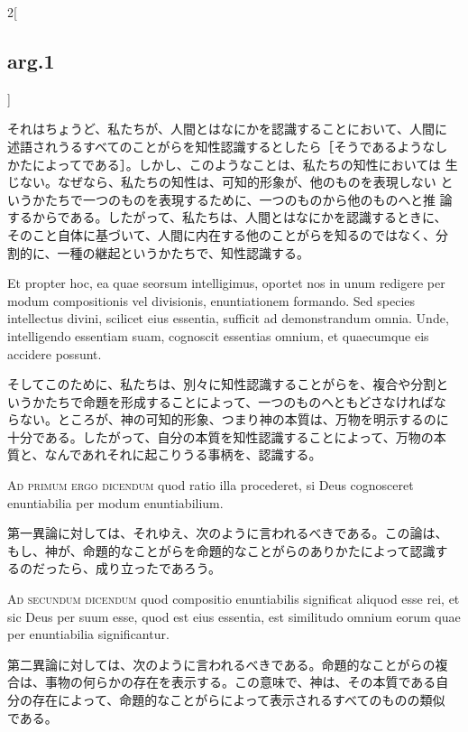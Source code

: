 \documentclass[paper=a4paper,fontsize=10pt,jafontsize=9pt,titlepage]{jlreq}
\begin{document}
\begin{paracol}{2}[\subsection{arg.1}]
\switchcolumn

それはちょうど、私たちが、人間とはなにかを認識することにおいて、人間に
述語されうるすべてのことがらを知性認識するとしたら［そうであるようなし
かたによってである］。しかし、このようなことは、私たちの知性においては
生じない。なぜなら、私たちの知性は、可知的形象が、他のものを表現しない
というかたちで一つのものを表現するために、一つのものから他のものへと推
論するからである。したがって、私たちは、人間とはなにかを認識するときに、
そのこと自体に基づいて、人間に内在する他のことがらを知るのではなく、分
割的に、一種の継起というかたちで、知性認識する。

\switchcolumn*

Et propter hoc, ea quae seorsum intelligimus, oportet nos in unum
redigere per modum compositionis vel divisionis, enuntiationem
formando. Sed species intellectus divini, scilicet eius essentia,
sufficit ad demonstrandum omnia. Unde, intelligendo essentiam suam,
cognoscit essentias omnium, et quaecumque eis accidere possunt.

\switchcolumn

そしてこのために、私たちは、別々に知性認識することがらを、複合や分割と
いうかたちで命題を形成することによって、一つのものへともどさなければな
らない。ところが、神の可知的形象、つまり神の本質は、万物を明示するのに
十分である。したがって、自分の本質を知性認識することによって、万物の本
質と、なんであれそれに起こりうる事柄を、認識する。

\switchcolumn*[\subsection{ad.1}]

{\scshape Ad primum ergo dicendum} quod ratio illa procederet, si Deus
cognosceret enuntiabilia per modum enuntiabilium.

\switchcolumn

第一異論に対しては、それゆえ、次のように言われるべきである。この論は、
もし、神が、命題的なことがらを命題的なことがらのありかたによって認識す
るのだったら、成り立ったであろう。

\switchcolumn*[\subsection{ad.2}]

{\scshape Ad secundum dicendum} quod compositio enuntiabilis
significat aliquod esse rei, et sic Deus per suum esse, quod est eius
essentia, est similitudo omnium eorum quae per enuntiabilia
significantur.

\switchcolumn

第二異論に対しては、次のように言われるべきである。命題的なことがらの複
合は、事物の何らかの存在を表示する。この意味で、神は、その本質である自
分の存在によって、命題的なことがらによって表示されるすべてのものの類似
である。

\end{paracol}
\end{document}

